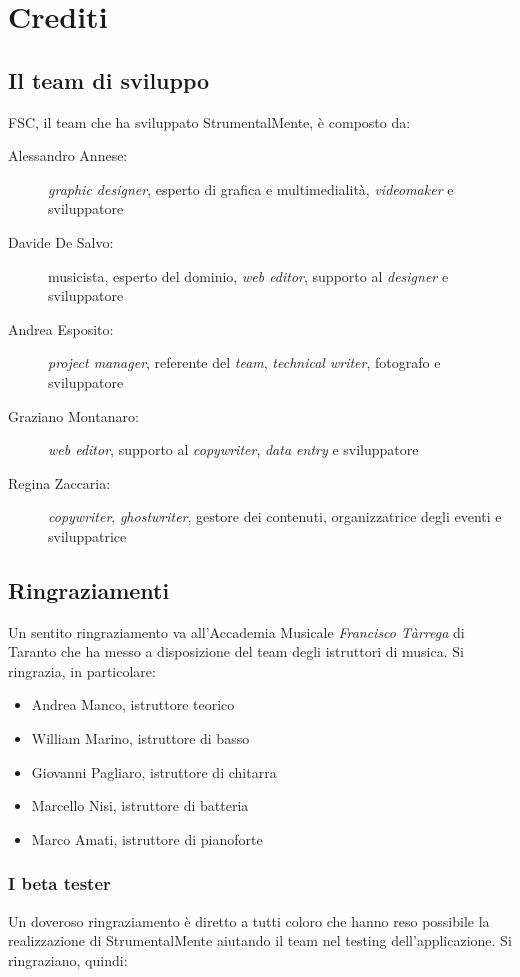 %
%

\chapter{Crediti}
\section{Il team di sviluppo}

FSC, il team che ha sviluppato StrumentalMente, è composto da:
\begin{description}
    \item[Alessandro Annese:] \textit{graphic designer}, esperto di grafica e multimedialità, \textit{videomaker} e sviluppatore
    \item[Davide De Salvo:] musicista, esperto del dominio, \textit{web editor}, supporto al \textit{designer} e sviluppatore
    \item[Andrea Esposito:] \textit{project manager}, referente del \textit{team}, \textit{technical writer}, fotografo e sviluppatore
    \item[Graziano Montanaro:] \textit{web editor}, supporto al \textit{copywriter}, \textit{data entry} e sviluppatore
    \item[Regina Zaccaria:] \textit{copywriter}, \textit{ghostwriter}, gestore dei contenuti, organizzatrice degli eventi e sviluppatrice
\end{description}

\section{Ringraziamenti}
Un sentito ringraziamento va all'Accademia Musicale \textit{Francisco Tàrrega} di Taranto che ha messo a disposizione del team degli istruttori di musica. Si ringrazia, in particolare:
\begin{itemize}
    \item Andrea Manco, istruttore teorico
    \item William Marino, istruttore di basso
    \item Giovanni Pagliaro, istruttore di chitarra
    \item Marcello Nisi, istruttore di batteria
    \item Marco Amati, istruttore di pianoforte
\end{itemize}
\subsection{I beta tester}
Un doveroso ringraziamento è diretto a tutti coloro che hanno reso possibile la realizzazione di StrumentalMente aiutando il team nel testing dell'applicazione. Si ringraziano, quindi: %
{\nome\ \cognome}